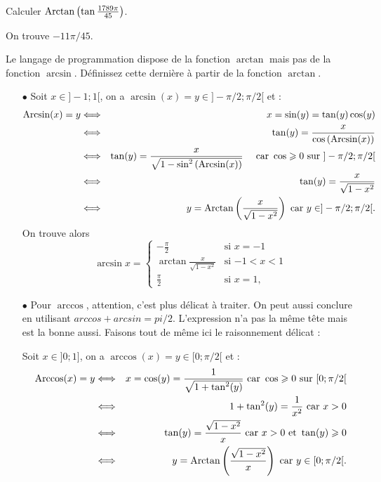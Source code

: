 \documentclass{magnolia}
\begin{document}
\begin{exos}
\exemple Calculer $\operatorname{Arctan}\left(\tan\frac{1789\pi}{45}\right)$.
  \begin{sol}
  On trouve $-11\pi/45$.
  \end{sol}
\exemple Le langage de programmation  dispose de la fonction
  $\arctan$ mais pas de la fonction $\arcsin$. Définissez cette
  dernière à partir de la fonction $\arctan$.
  \begin{sol}
  \begin{itemize}
  \item[$\bullet$]
  Soit $x\in ]-1;1[$, on a $\arcsin(x)=y \in ]-\pi/2;\pi/2[$ et :
  \begin{eqnarray*}
  \operatorname{Arcsin}(x)=y &\Longleftrightarrow & x=\sin(y)=\tan(y)\cos(y) \\
&\Longleftrightarrow & \tan(y)=\dfrac{x}{\cos\left(\operatorname{Arcsin}(x)\right)}\\
&\Longleftrightarrow & \tan(y)=\dfrac{x}{\sqrt{1-\sin^2\left(\operatorname{Arcsin}(x)\right)}} \quad \text{ car } \cos\geqslant 0 \text{ sur } ]-\pi/2;\pi/2[\\
&\Longleftrightarrow & \tan(y)=\frac{x}{\sqrt{1-x^2}}\\
&\Longleftrightarrow & y=\operatorname{Arctan}\left(\frac{x}{\sqrt{1-x^2}}\right) \text{ car } y\in ]-\pi/2;\pi/2[.
  \end{eqnarray*}
  On trouve alors
  \[\arcsin x=
    \begin{cases}
    -\frac{\pi}{2} & \text{si $x=-1$}\\
    \arctan\frac{x}{\sqrt{1-x^2}} & \text{si $-1<x<1$}\\
    \frac{\pi}{2} & \text{si $x=1$,}
    \end{cases}\]
    
    \item[$\bullet$]
    Pour $\arccos$, attention, c'est plus délicat à traiter. On peut aussi conclure en utilisant $arccos+arcsin=pi/2$. L'expression n'a pas la même tête mais est la bonne aussi.
    Faisons tout de même ici le raisonnement délicat :
    
    Soit $x\in ]0;1]$, on a $\arccos(x)=y \in [0;\pi/2[$ et :
  \begin{eqnarray*}
  \operatorname{Arccos}(x)=y &\Longleftrightarrow & x=\cos(y)=\dfrac{1}{\sqrt{1+\tan^2(y)}} \text{ car } \cos\geqslant 0 \text{ sur } [0;\pi/2[\\
&\Longleftrightarrow & 1+\tan^2(y)=\dfrac{1}{x^2} \text{ car } x>0\\
&\Longleftrightarrow & \tan(y)=\frac{\sqrt{1-x^2}}{x} \text{ car } x>0 \text{ et } \tan(y)\geqslant 0\\
&\Longleftrightarrow & y=\operatorname{Arctan}\left(\frac{\sqrt{1-x^2}}{x}\right) \text{ car } y\in [0;\pi/2[.
  \end{eqnarray*}
  

\end{itemize}
\end{sol}
\end{exos}
\end{document}
